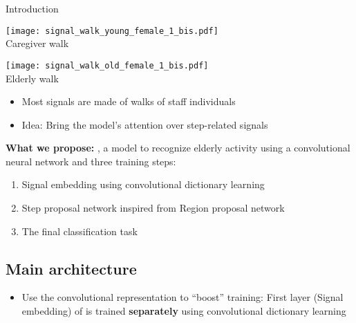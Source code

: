 \begin{frame}{Introduction}{}
\begin{minipage}[t]{0.40\linewidth}
\end{minipage}\hfill
\begin{minipage}[t]{0.59\linewidth}\vspace{0pt}
    \centering
    \begin{minipage}[t]{0.49\linewidth}\vspace{0pt}
    \centering
    \texttt{[image: signal\_walk\_young\_female\_1\_bis.pdf]}\\
    {\small Caregiver walk}
    \end{minipage}
    \begin{minipage}[t]{0.49\linewidth}\vspace{0pt}
    \centering
    \texttt{[image: signal\_walk\_old\_female\_1\_bis.pdf]}\\
    {\small Elderly walk}
    \end{minipage}


    \begin{itemize}
        \item Most signals are made of walks of staff individuals
        \item {Idea}: Bring the model's attention over step-related signals
    \end{itemize}
    \textbf{What we propose:} \algo, a model to recognize elderly activity using a convolutional neural network and three training steps:
        \begin{enumerate}
            \item Signal embedding using convolutional dictionary learning
            \item Step proposal network inspired from Region proposal network
            \item The final classification task
        \end{enumerate}

\end{minipage}

\end{frame}

\subsection{Main architecture}

\begin{frame}{\algo}{}

    
\medskip
\begin{itemize}
    \item Use the convolutional representation to ``boost'' training: First layer (Signal embedding) of \algo is trained \textbf{separately} using convolutional dictionary learning
\end{itemize}
\end{frame}

